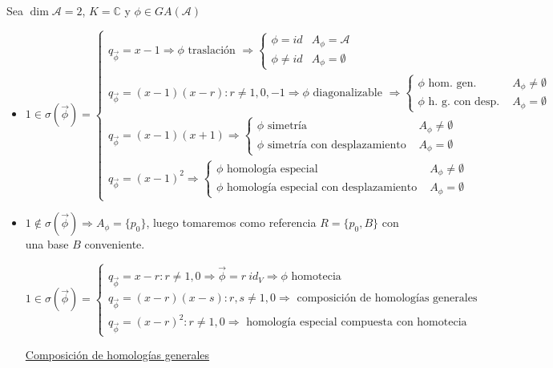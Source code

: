 \documentclass[10pt,a4paper,openright]{book}
\theoremstyle{break}
\begin{document}
Sea $\dim \mathcal{A} = 2$, $K = \mathbb{C}$ y $\phi \in GA(\mathcal{A})$
\begin{itemize}
\item $1 \in \sigma(\vec{\phi}) = \begin{cases} q_{\vec{\phi}} = x - 1 \Rightarrow \phi \mbox{ traslación } \Rightarrow \begin{cases} \phi = id & A_\phi = \mathcal{A} \\ \phi \neq id & A_\phi = \emptyset \end{cases} \\ q_{\vec{\phi}} = (x-1)(x-r) : r \neq 1,0,-1 \Rightarrow \phi \mbox{ diagonalizable } \Rightarrow \begin{cases} \phi \mbox{ hom. gen. } & A_\phi \neq \emptyset \\ \phi \mbox{ h. g. con desp. } & A_\phi = \emptyset \end{cases} \\ q_{\vec{\phi}} = (x-1)(x+1) \Rightarrow \begin{cases} \phi \mbox{ simetría } & A_\phi \neq \emptyset \\  \phi \mbox{ simetría con desplazamiento } & A_\phi = \emptyset\end{cases} \\ q_{\vec{\phi}} = (x-1)^2  \Rightarrow \begin{cases} \phi \mbox{ homología especial } & A_\phi \neq \emptyset \\ \phi \mbox{ homología especial con desplazamiento } & A_\phi = \emptyset   \end{cases} \end{cases}$

\item $1 \notin \sigma(\vec{\phi}) \Rightarrow A_\phi = \{ p_0\}$, luego tomaremos como referencia $R=\{p_0, B\}$ con una base $B$ conveniente.

$1 \in \sigma(\vec{\phi}) = \begin{cases} q_{\vec{\phi}} = x - r : r \neq 1,0 \Rightarrow \vec{\phi} = r \ id_V \Rightarrow \phi \mbox{ homotecia } \\  q_{\vec{\phi}} = (x - r)(x-s) : r,s \neq 1,0 \Rightarrow \mbox{ composición de homologías generales } \\ q_{\vec{\phi}} = (x - r)^2 : r \neq 1,0 \Rightarrow \mbox{ homología especial compuesta con homotecia } \end{cases}$

\underline{Composición de homologías generales}


\end{itemize}
\end{document}
